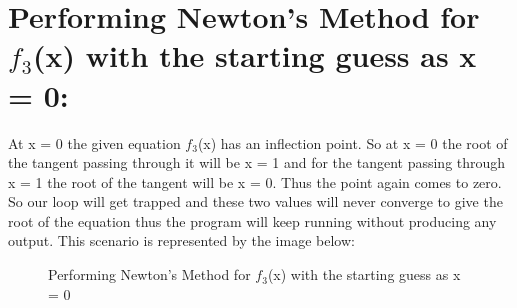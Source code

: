 \documentclass[12pt,a4paper]{article}
\begin{document}
\section{Performing Newton's Method for $f_3$(x) with the starting guess as x = 0:}
At x = 0 the given equation $f_3$(x) has an inflection point. So at x = 0 the root of the tangent passing through it will be x = 1 and for the tangent passing through x = 1 the root of the tangent will be x = 0. Thus the point again comes to zero. So our loop will get trapped and these two values will never converge to give the root of the equation thus the program will keep running without producing any output. This scenario is represented by the image below:
\begin{figure}[!ht]
	\begin{center}
	\end{center}
	\caption{Performing Newton's Method for $f_3$(x) with the starting guess as x = 0}
\end{figure}
\end{document}
